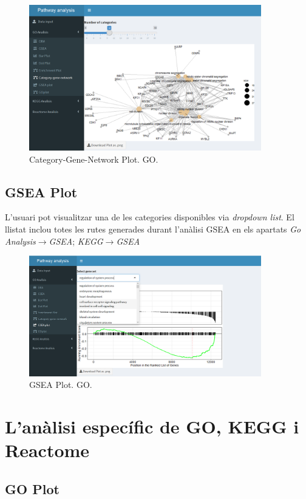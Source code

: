 \documentclass[]{article}
\begin{document}
\begin{figure}[H]
\centering
\includegraphics[width=0.9\textwidth]{App_F17_Items_GO_CnetPlot.png} 
\caption{Category-Gene-Network Plot. GO.}
\end{figure}

\subsection{GSEA Plot}
L'usuari pot visualitzar una de les categories disponibles via \textit{dropdown list}. El llistat inclou totes les rutes generades durant l'anàlisi GSEA en els apartats \textit{Go Analysis}$\rightarrow$\textit{GSEA}; \textit{KEGG}$\rightarrow$\textit{GSEA}
\begin{figure}[H]
\centering
\includegraphics[width=0.9\textwidth]{App_F18_Items_GO_GSEA_Plot.png} 
\caption{GSEA Plot. GO.}
\end{figure}


\section{L'anàlisi específic de GO, KEGG i Reactome}

\subsection{GO Plot}
\end{document}
